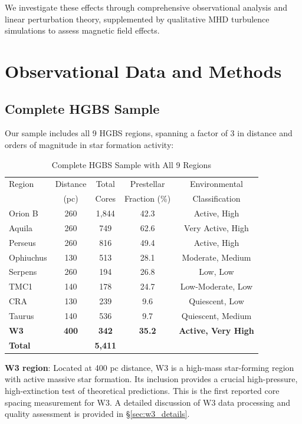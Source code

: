 \documentclass[11pt,a4paper]{article}
\begin{document}
We investigate these effects through comprehensive observational analysis and linear perturbation theory, supplemented by qualitative MHD turbulence simulations to assess magnetic field effects.

\section{Observational Data and Methods}

\subsection{Complete HGBS Sample}

Our sample includes all 9 HGBS regions, spanning a factor of 3 in distance and orders of magnitude in star formation activity:

\begin{table}[H]
\centering
\caption{Complete HGBS Sample with All 9 Regions}
\begin{tabular}{lcccc}
\toprule
Region & Distance & Total & Prestellar & Environmental \\
       & (pc)   & Cores & Fraction (\%) & Classification \\
\midrule
Orion B  & 260     & 1,844 & 42.3     & Active, High \\
Aquila   & 260     & 749   & 62.6     & Very Active, High \\
Perseus  & 260     & 816   & 49.4     & Active, High \\
Ophiuchus& 130     & 513   & 28.1     & Moderate, Medium \\
Serpens  & 260     & 194   & 26.8     & Low, Low \\
TMC1     & 140     & 178   & 24.7     & Low-Moderate, Low \\
CRA      & 130     & 239   & 9.6      & Quiescent, Low \\
Taurus   & 140     & 536   & 9.7      & Quiescent, Medium \\
\textbf{W3}      & \textbf{400}     & \textbf{342}   & \textbf{35.2}     & \textbf{Active, Very High} \\
\midrule
\textbf{Total} &        & \textbf{5,411} &        &  \\
\bottomrule
\end{tabular}
\end{table}

\noindent\textbf{W3 region}: Located at 400 pc distance, W3 is a high-mass star-forming region with active massive star formation. Its inclusion provides a crucial high-pressure, high-extinction test of theoretical predictions. This is the first reported core spacing measurement for W3. A detailed discussion of W3 data processing and quality assessment is provided in \S\ref{sec:w3_details}.
\end{document}
